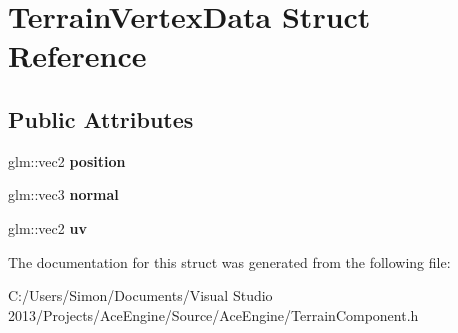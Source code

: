 \hypertarget{struct_terrain_vertex_data}{}\section{Terrain\+Vertex\+Data Struct Reference}
\label{struct_terrain_vertex_data}
\subsection*{Public Attributes}
\begin{DoxyCompactItemize}
\item 
\hypertarget{struct_terrain_vertex_data_ae6bef080a5485a5948375d42fe701475}{}glm\+::vec2 {\bfseries position}\label{struct_terrain_vertex_data_ae6bef080a5485a5948375d42fe701475}

\item 
\hypertarget{struct_terrain_vertex_data_a1b63c97ef2e95771d2ab58bd12babf24}{}glm\+::vec3 {\bfseries normal}\label{struct_terrain_vertex_data_a1b63c97ef2e95771d2ab58bd12babf24}

\item 
\hypertarget{struct_terrain_vertex_data_a0a363e2014242dbeabacf52cc4cec5a2}{}glm\+::vec2 {\bfseries uv}\label{struct_terrain_vertex_data_a0a363e2014242dbeabacf52cc4cec5a2}

\end{DoxyCompactItemize}


The documentation for this struct was generated from the following file\+:\begin{DoxyCompactItemize}
\item 
C\+:/\+Users/\+Simon/\+Documents/\+Visual Studio 2013/\+Projects/\+Ace\+Engine/\+Source/\+Ace\+Engine/Terrain\+Component.\+h\end{DoxyCompactItemize}
